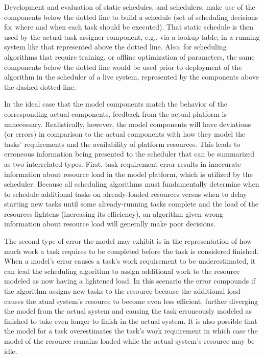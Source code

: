 \documentclass[10pt]{csce}
\begin{document}
Development and evaluation of static schedules, and schedulers, make use of the
components below the dotted line to build a schedule (set of scheduling
decisions for where and when each task should be executed).  That static
schedule is then used by the actual task assigner component, e.g., via a lookup
table, in a running system like that represented above the dotted line.  Also,
for scheduling algorithms that require training, or offline optimization of
parameters, the same components below the dotted line would be used prior to
deployment of the algorithm in the scheduler of a live system, represented
by the components above the dashed-dotted line.

In the ideal case that the model components match the behavior of the
corresponding actual components, feedback from the actual platform is
unnecessary. Realistically, however, the model components will have deviations
(or errors) in comparison to the actual components with how they
model the tasks' requirements and the availability of platform resources.  This
leads to erroneous information being presented to the scheduler that can be
summarized as two interrelated types.  First, task requirement error results in
inaccurate information about resource load in the model platform, which is
utilized by the scheduler.  Because all scheduling algorithms must fundamentally
determine when to schedule additional tasks on already-loaded resources versus
when to delay starting new tasks until some already-running tasks complete and
the load of the resources lightens (increasing its efficiency), an algorithm
given wrong information about resource load will generally make poor
decisions.

The second type of error the model may exhibit is in the representation of
how much work a task requires to be completed before the task is considered
finished.  When a model's error causes a task's work requirement to be
underestimated, it can lead the scheduling algorithm to assign additional
work to the resource modeled as now having a lightened load.  In this scenario
the error compounds if the algorithm assigns new tasks to the resource because
the additional load causes the atual system's resource to become even less
efficient, further diverging the model from the actual system and causing the
task erroneously modeled as finished to take even longer to finish in the
actual system.  It is also possible that the model for a task overestimates
the task's work requirement in which case the model of the resource remains
loaded while the actual system's resource may be idle.
\end{document}

